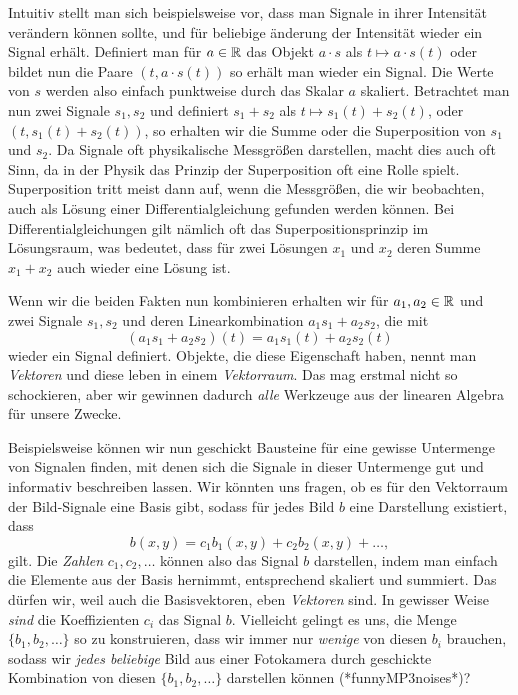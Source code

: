 Intuitiv stellt man sich beispielsweise vor, dass man Signale in ihrer Intensität verändern können sollte, und für beliebige änderung der Intensität wieder ein Signal erhält.
Definiert man für $a \in \mathbb{R}$ das Objekt $a \cdot s$ als $t \mapsto a \cdot s(t)$ oder bildet nun die Paare $(t, a \cdot s(t))$ so erhält man wieder ein Signal.
Die Werte von $s$ werden also einfach punktweise durch das Skalar $a$ skaliert.
Betrachtet man nun zwei Signale $s_1, s_2$ und definiert $s_1 + s_2$ als $t \mapsto s_1(t) + s_2(t)$, oder $(t, s_1(t) + s_2(t))$, so erhalten wir die Summe oder die Superposition von $s_1$ und $s_2$.
Da Signale oft physikalische Messgrößen darstellen, macht dies auch oft Sinn, da in der Physik das Prinzip der Superposition oft eine Rolle spielt.
Superposition tritt meist dann auf, wenn die Messgrößen, die wir beobachten, auch als Lösung einer Differentialgleichung gefunden werden können.
Bei Differentialgleichungen gilt nämlich oft das Superpositionsprinzip im Lösungsraum, was bedeutet, dass für zwei Lösungen $x_1$ und $x_2$ deren Summe $x_1 + x_2$ auch wieder eine Lösung ist.

Wenn wir die beiden Fakten nun kombinieren erhalten wir für $a_1, a_2 \in \mathbb{R}$ und zwei Signale $s_1, s_2$ und deren Linearkombination $a_1 s_1 + a_2 s_2$, die mit
\[
(a_1 s_1 + a_2 s_2)(t) = a_1 s_1(t) + a_2 s_2(t)
\]
wieder ein Signal definiert.
Objekte, die diese Eigenschaft haben, nennt man \emph{Vektoren} und diese leben in einem \emph{Vektorraum}.
Das mag erstmal nicht so schockieren, aber wir gewinnen dadurch \emph{alle} Werkzeuge aus der linearen Algebra für unsere Zwecke.

Beispielsweise können wir nun geschickt Bausteine für eine gewisse Untermenge von Signalen finden, mit denen sich die Signale in dieser Untermenge gut und informativ beschreiben lassen.
Wir könnten uns fragen, ob es für den Vektorraum der Bild-Signale eine Basis gibt, sodass für jedes Bild $b$ eine Darstellung existiert, dass
\begin{equation}\label{eq:basics:image_base}
    b(x,y) = c_1 b_1(x,y) + c_2 b_2(x,y) + \dots,
\end{equation}
gilt. 
Die \emph{Zahlen} $c_1, c_2, \dots$ können also das Signal $b$ darstellen, indem man einfach die Elemente aus der Basis hernimmt, entsprechend skaliert und summiert.
Das dürfen wir, weil auch die Basisvektoren, eben \emph{Vektoren} sind.
In gewisser Weise \emph{sind} die Koeffizienten $c_i$ das Signal $b$.
Vielleicht gelingt es uns, die Menge $\{b_1, b_2, \dots\}$ so zu konstruieren, dass wir immer nur \emph{wenige} von diesen $b_i$ brauchen, sodass wir \emph{jedes beliebige} Bild aus einer Fotokamera durch geschickte Kombination von diesen $\{b_1, b_2, \dots\}$ darstellen können (*funnyMP3noises*)?
%

